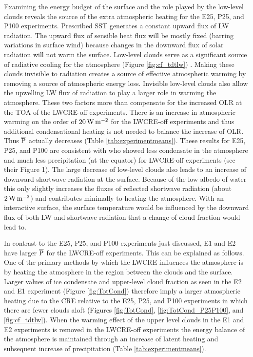 \documentclass[draft]{agujournal2019}
\begin{document}
{Examining the energy budget of the surface and the role played by the low-level clouds
reveals the source of the extra atmospheric heating for the E25, P25, and P100 experiments.  
Prescribed SST generates a constant upward flux of LW radiation.  
The upward flux of sensible heat flux will be mostly fixed (barring variations in surface
wind) because changes in the downward flux of solar radiation will not warm the surface.   
Low-level clouds  serve as a significant source of  radiative cooling for the atmosphere (Figure \ref{fig:cf_tdtlw}) .  
Making these clouds invisible to radiation creates a source of effective atmospheric warming by removing a source of atmospheric energy loss.  
Invisible low-level clouds also allow the upwelling LW flux of radiation to play a larger role in warming the atmosphere.
These two factors more than compensate for the increased OLR at the TOA of the LWCRE-off experiments.
There is an increase in atmospheric warming on the order of $20 \, \rm{W \,m^{-2}}$ for the LWCRE-off experiments and 
thus additional condensational heating is not needed to balance the increase of OLR. 
Thus $\overline{\rm{P}}$ actually decreases (Table \ref{tab:experimentmeans}).   
These results for E25, P25, and P100 are consistent with   who 
showed less condensate in the atmosphere and much less precipitation 
(at the equator) for LWCRE-off experiments (see their Figure 1).  
The large decrease of low-level clouds  also leads to an increase of downward shortwave radiation at the surface.  
Because of the low albedo of water this only slightly increases the fluxes of reflected shortwave radiation (about $2 \, \rm{W \,m^{-2}}$) 
and contributes minimally to heating the atmosphere.
With an interactive surface, the surface temperature would be influenced
by the downward flux of both LW and shortwave radiation that a change of cloud fraction would lead to.   


In contrast to the E25, P25, and P100 experiments just discussed, 
E1 and E2 have larger $\overline{\rm{P}}$ for the LWCRE-off experiments.  This can be explained as follows.  
One of the primary methods by which the LWCRE influences the atmosphere is by 
heating the atmosphere in the region between the clouds and the surface.  
Larger values of ice condensate and upper-level cloud fraction as seen in the E2 and E1 experiment 
(Figure \ref{fig:TotCond}) therefore imply a larger atmospheric heating due to the CRE relative to the 
E25, P25, and P100 experiments in which there are fewer clouds aloft (Figures \ref{fig:TotCond}, 
\ref{fig:TotCond_P25P100}, and \ref{fig:cf_tdtlw}).  When the warming effect of the upper level clouds 
in the E1 and E2 experiments is removed in the LWCRE-off experiments the energy balance of 
the atmosphere is maintained through an increase of latent heating and subsequent increase 
of precipitation (Table \ref{tab:experimentmeans}).  

}
\end{document}
